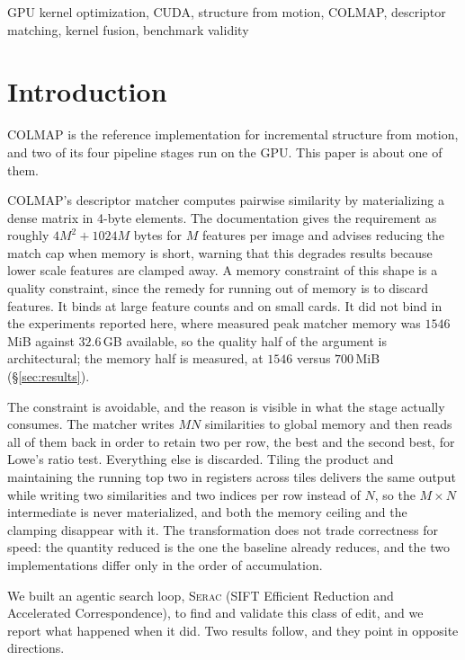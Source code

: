 \documentclass[conference]{IEEEtran}
\newcommand{\sys}{\textnormal{\textsc{Serac}}\xspace}
\begin{document}
\begin{IEEEkeywords}
GPU kernel optimization, CUDA, structure from motion, COLMAP, descriptor
matching, kernel fusion, benchmark validity
\end{IEEEkeywords}


\section{Introduction}
\label{sec:intro}

COLMAP \cite{schoenberger2016sfm} is the reference implementation for
incremental structure from motion, and two of its four pipeline stages run on
the GPU. This paper is about one of them.

COLMAP's descriptor matcher computes pairwise similarity by materializing a
dense matrix in 4-byte elements. The documentation \cite{schoenberger2016sfm,
schoenberger2016mvs} gives the requirement as roughly $4M^2 + 1024M$ bytes for
$M$ features per image and advises reducing the match cap when memory is short,
warning that this degrades results because lower scale features are clamped
away. A memory constraint of this shape is a quality constraint, since the
remedy for running out of memory is to discard features. It binds at large
feature counts and on small cards. It did not bind in the experiments reported
here, where measured peak matcher memory was $1546$\,MiB against $32.6$\,GB
available, so the quality half of the argument is architectural; the memory
half is measured, at $1546$ versus $700$\,MiB (\S\ref{sec:results}).

The constraint is avoidable, and the reason is visible in what the stage
actually consumes. The matcher writes $MN$ similarities to global memory and
then reads all of them back in order to retain two per row, the best and the
second best, for Lowe's ratio test. Everything else is discarded. Tiling the
product and maintaining the running top two in registers across tiles delivers
the same output while writing two similarities and two indices per row instead
of $N$, so the $M \times N$ intermediate is never materialized, and both the
memory ceiling and the clamping disappear with it. The transformation does not
trade correctness for speed: the quantity reduced is the one the baseline
already reduces, and the two implementations differ only in the order of
accumulation.

We built an agentic search loop, \sys{} (SIFT Efficient Reduction and
Accelerated Correspondence), to find and validate this class of edit, and we
report what happened when it did. Two results follow, and they point in
opposite directions.
\end{document}
